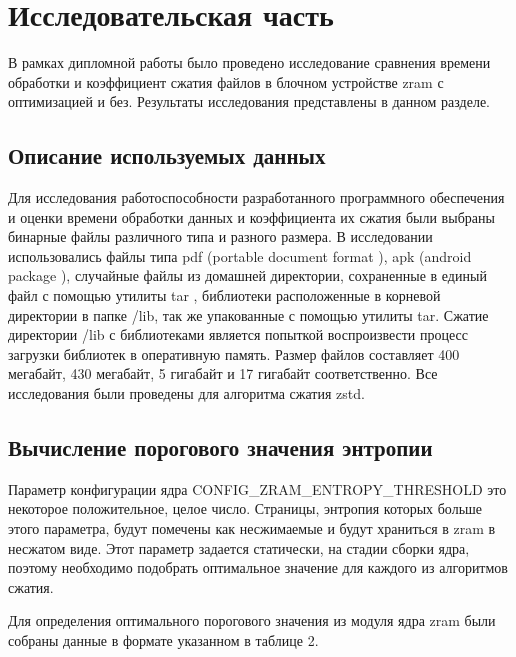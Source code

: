 \section{Исследовательская часть}

В рамках дипломной работы было проведено исследование сравнения времени обработки и коэффициент сжатия файлов в блочном устройстве zram с оптимизацией и без. Результаты исследования представлены в данном разделе.

\subsection{Описание используемых данных}

Для исследования работоспособности разработанного программного обеспечения и оценки времени обработки данных и коэффициента их сжатия были выбраны бинарные файлы различного типа и разного размера. В исследовании использовались файлы типа pdf (portable document format \cite{pdf}), apk (android package \cite{apk}), случайные файлы из домашней директории, сохраненные в единый файл с помощью утилиты tar \cite{tar}, библиотеки расположенные в корневой директории в папке /lib, так же упакованные с помощью утилиты tar. Сжатие директории /lib с библиотеками является попыткой воспроизвести процесс загрузки библиотек в оперативную память. Размер файлов составляет 400 мегабайт, 430 мегабайт, 5 гигабайт и 17 гигабайт соответственно. Все исследования были проведены для алгоритма сжатия zstd.

\subsection{Вычисление порогового значения энтропии}

Параметр конфигурации ядра CONFIG\_ZRAM\_ENTROPY\_THRESHOLD это некоторое положительное, целое число. Страницы, энтропия которых больше этого параметра, будут помечены как несжимаемые и будут храниться в zram в несжатом виде. Этот параметр задается статически, на стадии сборки ядра, поэтому необходимо подобрать оптимальное значение для каждого из алгоритмов сжатия.

Для определения оптимального порогового значения из модуля ядра zram были собраны данные в формате указанном в таблице 2.

